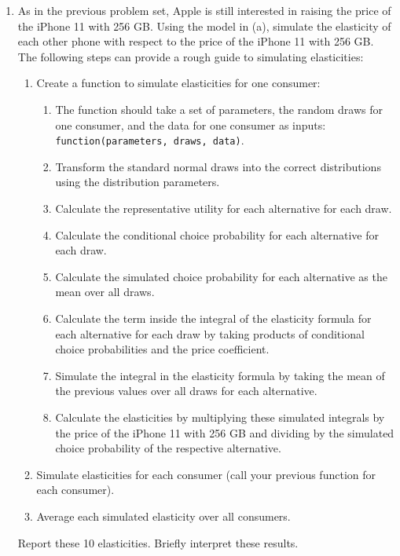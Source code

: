 \documentclass[11pt,letterpaper]{article}
\begin{document}
\begin{enumerate}[label=\alph*., leftmargin=*]
	\item As in the previous problem set, Apple is still interested in raising the price of the iPhone 11 with 256 GB. Using the model in (a), simulate the elasticity of each other phone with respect to the price of the iPhone 11 with 256 GB. The following steps can provide a rough guide to simulating elasticities:
	\begin{enumerate}[label=\Roman*.]
		\item Create a function to simulate elasticities for one consumer:
		\begin{enumerate}[label=\roman*.]
			\item The function should take a set of parameters, the random draws for one consumer, and the data for one consumer as inputs: \texttt{function(parameters, draws, data)}.
			\item Transform the standard normal draws into the correct distributions using the distribution parameters.
			\item Calculate the representative utility for each alternative for each draw.
			\item Calculate the conditional choice probability for each alternative for each draw.
			\item Calculate the simulated choice probability for each alternative as the mean over all draws.
			\item Calculate the term inside the integral of the elasticity formula for each alternative for each draw by taking products of conditional choice probabilities and the price coefficient.
			\item Simulate the integral in the elasticity formula by taking the mean of the previous values over all draws for each alternative.
			\item Calculate the elasticities by multiplying these simulated integrals by the price of the iPhone 11 with 256 GB and dividing by the simulated choice probability of the respective alternative.
		\end{enumerate}
		\item Simulate elasticities for each consumer (call your previous function for each consumer).
		\item Average each simulated elasticity over all consumers.
	\end{enumerate}
	Report these 10 elasticities. Briefly interpret these results.
\end{enumerate}
\end{document}
